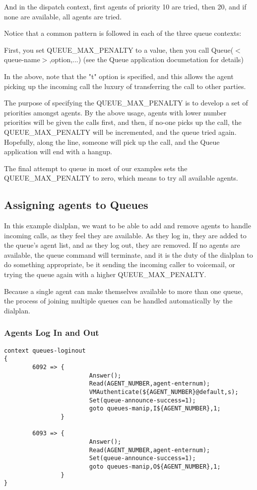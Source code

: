 And in the dispatch context, first agents of priority 10 are tried, then
20, and if none are available, all agents are tried.

Notice that a common pattern is followed in each of the three queue contexts:

First, you set QUEUE\_MAX\_PENALTY to a value, then you call
Queue($<$queue-name$>$,option,...) (see the Queue application documetation for details)

In the above, note that the "t" option is specified, and this allows the
agent picking up the incoming call the luxury of transferring the call to
other parties.

The purpose of specifying the QUEUE\_MAX\_PENALTY is to develop a set of priorities
amongst agents. By the above usage, agents with lower number priorities will
be given the calls first, and then, if no-one picks up the call, the QUEUE\_MAX\_PENALTY
will be incremented, and the queue tried again. Hopefully, along the line, someone
will pick up the call, and the Queue application will end with a hangup.

The final attempt to queue in most of our examples sets the QUEUE\_MAX\_PENALTY
to zero, which means to try all available agents.


\subsection{Assigning agents to Queues}

In this example dialplan, we want to be able to add and remove agents to
handle incoming calls, as they feel they are available. As they log in,
they are added to the queue's agent list, and as they log out, they are
removed. If no agents are available, the queue command will terminate, and
it is the duty of the dialplan to do something appropriate, be it sending
the incoming caller to voicemail, or trying the queue again with a higher
QUEUE\_MAX\_PENALTY.

Because a single agent can make themselves available to more than one queue,
the process of joining multiple queues can be handled automatically by the
dialplan.

\subsubsection{Agents Log In and Out}

\begin{astlisting}
\begin{verbatim}
context queues-loginout
{
        6092 => {
                        Answer();
                        Read(AGENT_NUMBER,agent-enternum);
                        VMAuthenticate(${AGENT_NUMBER}@default,s);
                        Set(queue-announce-success=1);
                        goto queues-manip,I${AGENT_NUMBER},1;
                }

        6093 => {
                        Answer();
                        Read(AGENT_NUMBER,agent-enternum);
                        Set(queue-announce-success=1);
                        goto queues-manip,O${AGENT_NUMBER},1;
                }
}
\end{verbatim}
\end{astlisting}

